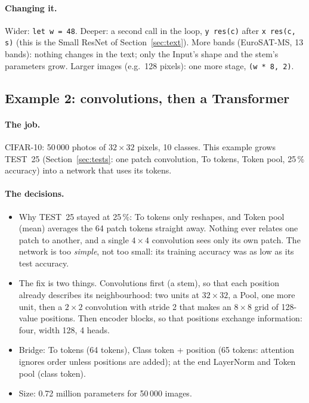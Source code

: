 \paragraph{Changing it.} Wider: \texttt{let w = 48}. Deeper: a second call in the loop, \texttt{y res(c)} after \texttt{x res(c, s)}
(this is the Small ResNet of Section~\ref{sec:text}). More bands (EuroSAT-MS, 13 bands): nothing changes in the text; only the Input's
shape and the stem's parameters grow. Larger images (e.g.\ 128 pixels): one more stage, \texttt{(w * 8, 2)}.

\subsection{Example 2: convolutions, then a Transformer}
\label{sec:build-ex2}
\paragraph{The job.} CIFAR-10: 50\,000 photos of $32\times32$ pixels, 10 classes. This example grows TEST~25 (Section~\ref{sec:tests}:
one patch convolution, To tokens, Token pool, 25\,\% accuracy) into a network that uses its tokens.

\paragraph{The decisions.}
\begin{itemize}[nosep]
  \item Why TEST~25 stayed at 25\,\%: To tokens only reshapes, and Token pool (mean) averages the 64 patch tokens straight away. Nothing
        ever relates one patch to another, and a single $4\times4$ convolution sees only its own patch. The network is too \emph{simple},
        not too small: its training accuracy was as low as its test accuracy.
  \item The fix is two things. Convolutions first (a stem), so that each position already describes its neighbourhood: two units at
        $32\times32$, a Pool, one more unit, then a $2\times2$ convolution with stride 2 that makes an $8\times8$ grid of 128-value
        positions. Then encoder blocks, so that positions exchange information: four, width 128, 4 heads.
  \item Bridge: To tokens (64 tokens), Class token + position (65 tokens: attention ignores order unless positions are added); at the
        end LayerNorm and Token pool (class token).
  \item Size: 0.72 million parameters for 50\,000 images.
\end{itemize}

